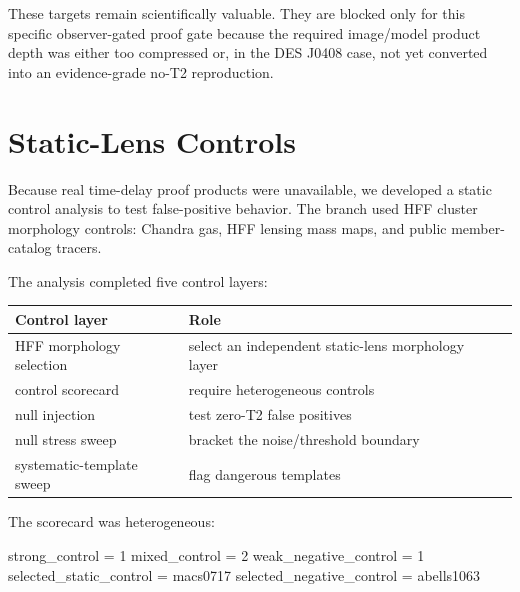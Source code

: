 \documentclass[11pt]{article}
\newenvironment{Shaded}{}{}
\newcommand{\NormalTok}[1]{#1}
\newcounter{none} %
\begin{document}
These targets remain scientifically valuable. They are blocked only for
this specific observer-gated proof gate because the required image/model
product depth was either too compressed or, in the DES J0408 case, not yet
converted into an evidence-grade no-T2 reproduction.

\section{Static-Lens Controls}\label{static-lens-controls}

Because real time-delay proof products were unavailable, we developed a
static control analysis to test false-positive behavior. The branch used
HFF cluster morphology controls: Chandra gas, HFF lensing mass maps, and
public member-catalog tracers.

The analysis completed five control layers:

{\def\LTcaptype{none} %
\begin{longtable}[]{@{}
  >{\raggedright\arraybackslash}p{}
  >{\raggedright\arraybackslash}p{}
  >{\raggedright\arraybackslash}p{}@{}}
\toprule\noalign{}
\begin{minipage}[b]{\linewidth}\raggedright
Control layer
\end{minipage} & \begin{minipage}[b]{\linewidth}\raggedright
Role
\end{minipage} & \begin{minipage}[b]{\linewidth}\raggedright
\end{minipage} \\
\midrule\noalign{}
\endhead
\bottomrule\noalign{}
\endlastfoot
HFF morphology selection & select an independent static-lens morphology
layer & \\
control scorecard & require heterogeneous controls & \\
null injection & test zero-T2 false positives & \\
null stress sweep & bracket the noise/threshold boundary & \\
systematic-template sweep & flag dangerous templates & \\
\end{longtable}
}

The scorecard was heterogeneous:

\begin{Shaded}
\begin{Highlighting}[]
\NormalTok{strong\_control = 1}
\NormalTok{mixed\_control = 2}
\NormalTok{weak\_negative\_control = 1}
\NormalTok{selected\_static\_control = macs0717}
\NormalTok{selected\_negative\_control = abells1063}
\end{Highlighting}
\end{Shaded}
\end{document}

